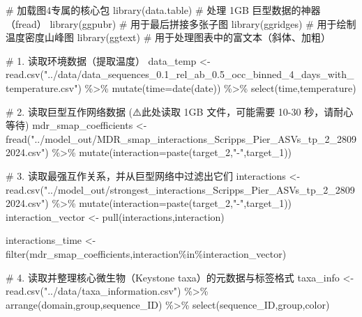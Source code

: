 \documentclass[
  letterpaper,
  DIV=11,
  numbers=noendperiod]{scrreprt}
\newenvironment{Shaded}{\begin{snugshade}}{\end{snugshade}}
\newcommand{\AttributeTok}[1]{\textcolor[rgb]{0.40,0.45,0.13}{#1}}
\newcommand{\CommentTok}[1]{\textcolor[rgb]{0.37,0.37,0.37}{#1}}
\newcommand{\FunctionTok}[1]{\textcolor[rgb]{0.28,0.35,0.67}{#1}}
\newcommand{\NormalTok}[1]{\textcolor[rgb]{0.00,0.23,0.31}{#1}}
\newcommand{\OtherTok}[1]{\textcolor[rgb]{0.00,0.23,0.31}{#1}}
\newcommand{\SpecialCharTok}[1]{\textcolor[rgb]{0.37,0.37,0.37}{#1}}
\newcommand{\StringTok}[1]{\textcolor[rgb]{0.13,0.47,0.30}{#1}}
\begin{document}
\begin{Shaded}
\begin{Highlighting}[]
\CommentTok{\# 加载图4专属的核心包}
\FunctionTok{library}\NormalTok{(data.table) }\CommentTok{\# 处理 1GB 巨型数据的神器（fread）}
\FunctionTok{library}\NormalTok{(ggpubr)     }\CommentTok{\# 用于最后拼接多张子图}
\FunctionTok{library}\NormalTok{(ggridges)   }\CommentTok{\# 用于绘制温度密度山峰图}
\FunctionTok{library}\NormalTok{(ggtext)     }\CommentTok{\# 用于处理图表中的富文本（斜体、加粗）}

\CommentTok{\# 1. 读取环境数据（提取温度）}
\NormalTok{data\_temp }\OtherTok{\textless{}{-}} \FunctionTok{read.csv}\NormalTok{(}\StringTok{"../data/data\_sequences\_0.1\_rel\_ab\_0.5\_occ\_binned\_4\_days\_with\_temperature.csv"}\NormalTok{) }\SpecialCharTok{\%\textgreater{}\%}
  \FunctionTok{mutate}\NormalTok{(}\AttributeTok{time=}\FunctionTok{date}\NormalTok{(date)) }\SpecialCharTok{\%\textgreater{}\%}
  \FunctionTok{select}\NormalTok{(time,temperature)}

\CommentTok{\# 2. 读取巨型互作网络数据 (⚠️此处读取 1GB 文件，可能需要 10{-}30 秒，请耐心等待)}
\NormalTok{mdr\_smap\_coefficients }\OtherTok{\textless{}{-}} \FunctionTok{fread}\NormalTok{(}\StringTok{"../model\_out/MDR\_smap\_interactions\_Scripps\_Pier\_ASVs\_tp\_2\_28092024.csv"}\NormalTok{) }\SpecialCharTok{\%\textgreater{}\%}
  \FunctionTok{mutate}\NormalTok{(}\AttributeTok{interaction=}\FunctionTok{paste}\NormalTok{(target\_2,}\StringTok{"{-}"}\NormalTok{,target\_1))}

\CommentTok{\# 3. 读取最强互作关系，并从巨型网络中过滤出它们}
\NormalTok{interactions }\OtherTok{\textless{}{-}} \FunctionTok{read.csv}\NormalTok{(}\StringTok{"../model\_out/strongest\_interactions\_Scripps\_Pier\_ASVs\_tp\_2\_28092024.csv"}\NormalTok{) }\SpecialCharTok{\%\textgreater{}\%}
  \FunctionTok{mutate}\NormalTok{(}\AttributeTok{interaction=}\FunctionTok{paste}\NormalTok{(target\_2,}\StringTok{"{-}"}\NormalTok{,target\_1))}
\NormalTok{interaction\_vector }\OtherTok{\textless{}{-}} \FunctionTok{pull}\NormalTok{(interactions,interaction)}

\NormalTok{interactions\_time }\OtherTok{\textless{}{-}} \FunctionTok{filter}\NormalTok{(mdr\_smap\_coefficients,interaction}\SpecialCharTok{\%in\%}\NormalTok{interaction\_vector) }

\CommentTok{\# 4. 读取并整理核心微生物（Keystone taxa）的元数据与标签格式}
\NormalTok{taxa\_info }\OtherTok{\textless{}{-}} \FunctionTok{read.csv}\NormalTok{(}\StringTok{"../data/taxa\_information.csv"}\NormalTok{) }\SpecialCharTok{\%\textgreater{}\%}
  \FunctionTok{arrange}\NormalTok{(domain,group,sequence\_ID) }\SpecialCharTok{\%\textgreater{}\%}
  \FunctionTok{select}\NormalTok{(sequence\_ID,group,color)}


\end{Highlighting}
\end{Shaded}
\end{document}
